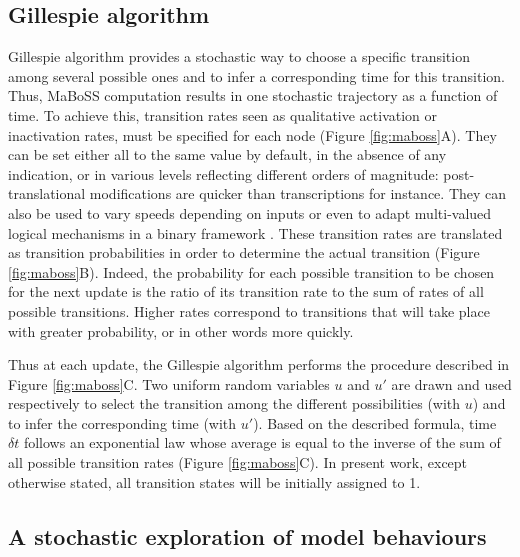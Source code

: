 \documentclass[a4paper,12pt,twoside,onecolumn,openright,final,oldfontcommands]{memoir}
\begin{document}
\subsection{Gillespie algorithm}\label{gillespie-algorithm}

Gillespie algorithm provides a stochastic way to choose a specific
transition among several possible ones and to infer a corresponding time
for this transition. Thus, MaBoSS computation results in one stochastic
trajectory as a function of time. To achieve this, transition rates seen
as qualitative activation or inactivation rates, must be specified for
each node (Figure \ref{fig:maboss}A). They can be set either all to the
same value by default, in the absence of any indication, or in various
levels reflecting different orders of magnitude: post-translational
modifications are quicker than transcriptions for instance. They can
also be used to vary speeds depending on inputs or even to adapt
multi-valued logical mechanisms in a binary framework
\citep{stoll_continuous_2012}. These transition rates are translated as
transition probabilities in order to determine the actual transition
(Figure \ref{fig:maboss}B). Indeed, the probability for each possible
transition to be chosen for the next update is the ratio of its
transition rate to the sum of rates of all possible transitions. Higher
rates correspond to transitions that will take place with greater
probability, or in other words more quickly.

Thus at each update, the Gillespie algorithm performs the procedure
described in Figure \ref{fig:maboss}C. Two uniform random variables
\(u\) and \(u'\) are drawn and used respectively to select the
transition among the different possibilities (with \(u\)) and to infer
the corresponding time (with \(u'\)). Based on the described formula,
time \(\delta t\) follows an exponential law whose average is equal to
the inverse of the sum of all possible transition rates (Figure
\ref{fig:maboss}C). In present work, except otherwise stated, all
transition states will be initially assigned to 1.

\subsection{A stochastic exploration of model
behaviours}\label{a-stochastic-exploration-of-model-behaviours}
\end{document}
